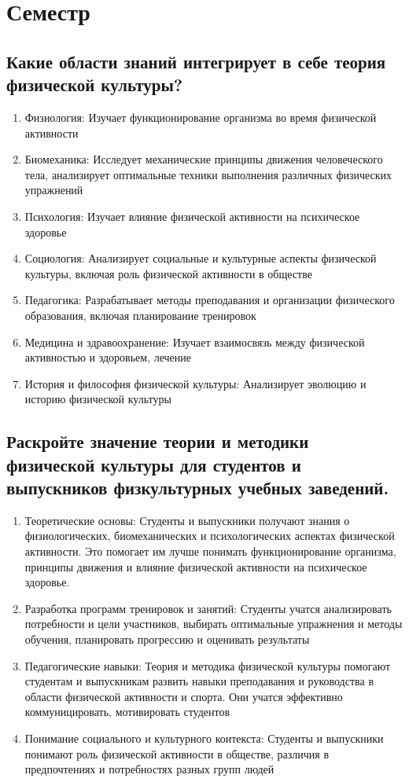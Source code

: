 \section{Семестр}

\subsection{Какие области знаний интегрирует в себе теория физической культуры?}

\begin{enumerate}
    \item Физиология: Изучает функционирование организма во время физической активности
    \item Биомеханика: Исследует механические принципы движения человеческого тела, анализирует оптимальные техники выполнения различных физических упражнений
    \item Психология: Изучает влияние физической активности на психическое здоровье
    \item Социология: Анализирует социальные и культурные аспекты физической культуры, включая роль физической активности в обществе
    \item Педагогика: Разрабатывает методы преподавания и организации физического образования, включая планирование тренировок
    \item Медицина и здравоохранение: Изучает взаимосвязь между физической активностью и здоровьем, лечение
    \item История и философия физической культуры: Анализирует эволюцию и историю физической культуры
\end{enumerate}

\subsection{Раскройте значение теории и методики физической культуры для студентов и выпускников физкультурных учебных заведений.}

\begin{enumerate}
    \item Теоретические основы: Студенты и выпускники получают знания о физиологических, биомеханических и психологических аспектах физической активности. Это помогает им лучше понимать функционирование организма, принципы движения и влияние физической активности на психическое здоровье.
    \item Разработка программ тренировок и занятий: Студенты учатся анализировать потребности и цели участников, выбирать оптимальные упражнения и методы обучения, планировать прогрессию и оценивать результаты
    \item Педагогические навыки: Теория и методика физической культуры помогают студентам и выпускникам развить навыки преподавания и руководства в области физической активности и спорта. Они учатся эффективно коммуницировать, мотивировать студентов
    \item Понимание социального и культурного контекста: Студенты и выпускники понимают роль физической активности в обществе, различия в предпочтениях и потребностях разных групп людей
\end{enumerate}

